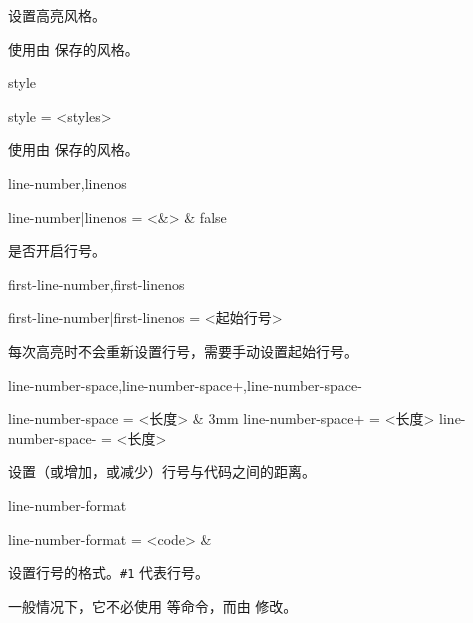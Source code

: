 \documentclass[class=article,openany]{cusdoc}[2025/10/10]
\begin{document}
\begin{function}{\THSaveStyle}
  \begin{syntax}
    \V\THSaveStyle {} 
  \end{syntax}
设置高亮风格。
\end{function}

\begin{function}{\THUseSavedStyle}
  \begin{syntax}
    \V\THUseSavedStyle {}
  \end{syntax}
使用由  保存的风格。
\end{function}

\begin{keyval}[path=high]{style}
  \begin{syntax}
    style = <styles>
  \end{syntax}
使用由  保存的风格。
\end{keyval}

\begin{keyval}[path=high]{line-number,linenos}
  \begin{syntax}
    line-number|linenos = <&\TTF> & false
  \end{syntax}
是否开启行号。
\end{keyval}

\begin{keyval}[path=high]{first-line-number,first-linenos}
  \begin{syntax}
    first-line-number|first-linenos = <起始行号>
  \end{syntax}
 每次高亮时不会重新设置行号，需要手动设置起始行号。
\end{keyval}

\begin{keyval}[path=high]{line-number-space,line-number-space+,line-number-space-}
  \begin{syntax}
    line-number-space  = <长度> & 3mm
    line-number-space+ = <长度>
    line-number-space- = <长度>
  \end{syntax}
设置（或增加，或减少）行号与代码之间的距离。
\end{keyval}

\begin{keyval}[path=high]{line-number-format}
  \begin{syntax}
    line-number-format = <code> & 
  \end{syntax}
设置行号的格式。\verb|#1| 代表行号。

一般情况下，它不必使用  等命令，而由  修改。
\end{keyval}
\end{document}
